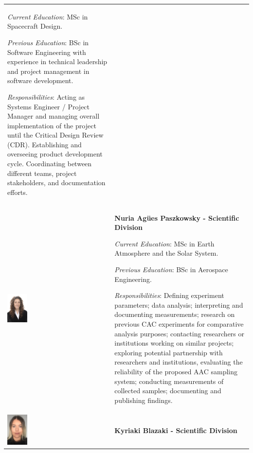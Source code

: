 \documentclass[a4paper,12pt,oneside]{article}
\begin{document}
\begin{longtable}[]{m{} m{}}
\smallskip
\textit{Current Education}: MSc in Spacecraft Design.

\smallskip
\textit{Previous Education}: BSc in Software Engineering with experience in technical leadership and project management in software development.

\smallskip
\textit{Responsibilities}: Acting as Systems Engineer / Project Manager and managing overall implementation of the project until the Critical Design Review (CDR). Establishing and overseeing product development cycle. Coordinating between different teams, project stakeholders, and documentation efforts.                          
\bigskip
\\

\includegraphics[width=0.2\textwidth]{1-introduction/img/agues-paszkowsky.jpg} & \textbf{Nuria Agües Paszkowsky - Scientific Division}

\smallskip
\textit{Current Education}: MSc in Earth Atmosphere and the Solar System.

\smallskip
\textit{Previous Education}: BSc in Aerospace Engineering.

\smallskip
\textit{Responsibilities}: Defining experiment parameters; data analysis; interpreting and documenting measurements; research on previous CAC experiments for comparative analysis purposes; contacting researchers or institutions working on similar projects; exploring potential partnership with researchers and institutions, evaluating the reliability of the proposed AAC sampling system; conducting measurements of collected samples; documenting and publishing findings. 
\bigskip
\\

\includegraphics[width=0.2\textwidth]{1-introduction/img/kiki-blazaki.jpg} & \textbf{Kyriaki Blazaki - Scientific Division}


\end{longtable}
\end{document}
